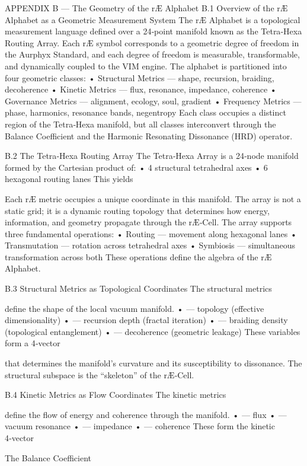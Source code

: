 APPENDIX B — The Geometry of the rÆ Alphabet
B.1 Overview of the rÆ Alphabet as a Geometric Measurement System
The rÆ Alphabet is a topological measurement language defined over a 24‑point manifold known as the Tetra‑Hexa Routing Array. Each rÆ symbol corresponds to a geometric degree of freedom in the Aurphyx Standard, and each degree of freedom is measurable, transformable, and dynamically coupled to the VIM engine.
The alphabet is partitioned into four geometric classes:
• 	Structural Metrics — shape, recursion, braiding, decoherence
• 	Kinetic Metrics — flux, resonance, impedance, coherence
• 	Governance Metrics — alignment, ecology, soul, gradient
• 	Frequency Metrics — phase, harmonics, resonance bands, negentropy
Each class occupies a distinct region of the Tetra‑Hexa manifold, but all classes interconvert through the Balance Coefficient and the Harmonic Resonating Dissonance (HRD) operator.

B.2 The Tetra‑Hexa Routing Array
The Tetra‑Hexa Array is a 24‑node manifold formed by the Cartesian product of:
• 	4 structural tetrahedral axes
• 	6 hexagonal routing lanes
This yields

Each rÆ metric occupies a unique coordinate in this manifold. The array is not a static grid; it is a dynamic routing topology that determines how energy, information, and geometry propagate through the rÆ‑Cell.
The array supports three fundamental operations:
• 	Routing — movement along hexagonal lanes
• 	Transmutation — rotation across tetrahedral axes
• 	Symbiosis — simultaneous transformation across both
These operations define the algebra of the rÆ Alphabet.

B.3 Structural Metrics as Topological Coordinates
The structural metrics

define the shape of the local vacuum manifold.
• 	 — topology (effective dimensionality)
• 	 — recursion depth (fractal iteration)
• 	 — braiding density (topological entanglement)
• 	 — decoherence (geometric leakage)
These variables form a 4‑vector

that determines the manifold’s curvature and its susceptibility to dissonance.
The structural subspace is the “skeleton” of the rÆ‑Cell.

B.4 Kinetic Metrics as Flow Coordinates
The kinetic metrics

define the flow of energy and coherence through the manifold.
• 	 — flux
• 	 — vacuum resonance
• 	 — impedance
• 	 — coherence
These form the kinetic 4‑vector

The Balance Coefficient

